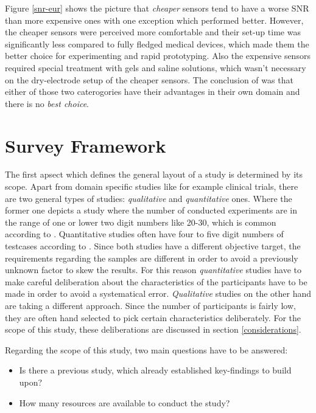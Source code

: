             Figure \ref{snr-eur} shows the picture that \textit{cheaper} sensors tend to have a worse SNR than more expensive ones with one exception which performed better. However, the cheaper sensors were perceived more comfortable and their set-up time was significantly less compared to fully fledged medical devices, which made them the better choice for experimenting and rapid prototyping. Also the expensive sensors required special treatment with gels and saline solutions, which wasn't necessary on the dry-electrode setup of the cheaper sensors. The conclusion of \cite{Zerafa.2018} was that either of those two caterogories have their advantages in their own domain and there is no \textit{best choice}.

    \chapter{Survey Framework}\label{survey-framework}

        The first apsect which defines the general layout of a study is determined by its scope. Apart from domain specific studies like for example clinical trials, there are two general types of studies: \textit{qualitative} and \textit{quantitative} ones. Where the former one depicts a study where the number of conducted experiments are in the range of one or lower two digit numbers like 20-30, which is common according to \cite[302]{Doring.2016}. Quantitative studies often have four to five digit numbers of testcases according to \cite[305]{Doring.2016}. Since both studies have a different objective target, the requirements regarding the samples are different in order to avoid a previously unknown factor to skew the results. For this reason \textit{quantitative} studies have to make careful deliberation about the characteristics of the participants have to be made in order to avoid a systematical error. \textit{Qualitative} studies on the other hand are taking a different approach. Since the number of participants is fairly low, they are often hand selected to pick certain characteristics deliberately. For the scope of this study, these deliberations are discussed in section \ref*{considerations}. 

        Regarding the scope of this study, two main questions have to be answered:

        \begin{itemize}
            \item Is there a previous study, which already established key-findings to build upon?
            \item How many resources are available to conduct the study?
        \end{itemize}

